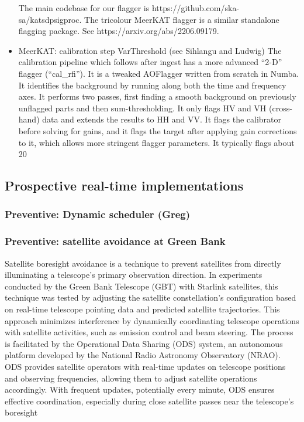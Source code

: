 \begin{itemize}
The main codebase for our flagger is https://github.com/ska-sa/katsdpsigproc. The tricolour MeerKAT flagger is a similar standalone flagging package. See https://arxiv.org/abs/2206.09179.


\item MeerKAT: calibration step VarThreshold  (see Sihlangu and Ludwig)
The calibration pipeline which follows after ingest has a more advanced “2-D” flagger (“cal\_rfi”). It is a tweaked AOFlagger written from scratch in Numba. It identifies the background by running along both the time and frequency axes. It performs two passes, first finding a smooth background on previously unflagged parts and then sum-thresholding. It only flags HV and VH (cross-hand) data and extends the results to HH and VV. It flags the calibrator before solving for gains, and it flags the target after applying gain corrections to it, which allows more stringent flagger parameters. It typically flags about 20%


\end{itemize}

\subsection{Prospective real-time implementations}
\label{subsection:hardware:catalog:prospective}

\subsubsection{Preventive: Dynamic scheduler (Greg)}
\subsubsection{Preventive: satellite avoidance at Green Bank}
Satellite boresight avoidance is a technique to prevent satellites from directly illuminating a telescope's primary observation direction. In experiments conducted by the Green Bank Telescope (GBT) with Starlink satellites, this technique was tested \cite{nhan2024spectrumcoexistencedemonstrationeffectiveness} by adjusting the satellite constellation's configuration based on real-time telescope pointing data and predicted satellite trajectories. This approach minimizes interference by dynamically coordinating telescope operations with satellite activities, such as emission control and beam steering. The process is facilitated by the Operational Data Sharing (ODS) system, an autonomous platform developed by the National Radio Astronomy Observatory (NRAO). ODS provides satellite operators with real-time updates on telescope positions and observing frequencies, allowing them to adjust satellite operations accordingly. With frequent updates, potentially every minute, ODS ensures effective coordination, especially during close satellite passes near the telescope’s boresight

